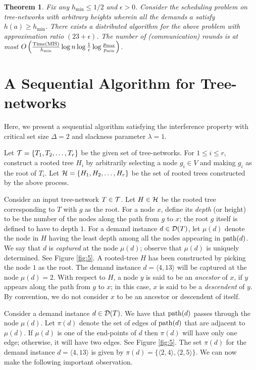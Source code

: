 \documentclass[11pt]{article}
\newtheorem{theorem}{\bf Theorem}[section]
\newcommand{\calT} {{\cal T}}
\newcommand{\calH} {{\cal H}}
\newcommand{\calD} {{\cal D}}
\newcommand{\mypath} {{\rm path}}
\newcommand{\TMIS} {{\rm Time(MIS)}}
\newcommand{\pair}[2] {\langle #1,#2 \rangle}
\begin{document}
\begin{theorem}
Fix any $h_{\min}\leq 1/2$ and $\epsilon>0$. Consider the scheduling problem on tree-networks
with arbitrary heights wherein all the demands $a$ satisfy $h(a) \geq h_{\min}$.
There exists a distributed algorithm for the above problem with approximation ratio $(23+\epsilon)$.
The number of (communication) rounds is at most 
$O\left( \frac{\TMIS}{h_{\min}} \log n \log{ \frac{1}{\epsilon} } \log{ \frac{p_{\max}}{p_{\min}} }\right)$.
\end{theorem}




\appendix
\section{A Sequential Algorithm for Tree-networks}
\label{sec:Lewin}
Here, we present a sequential algorithm satisfying the interference property with 
critical set size $\Delta=2$ and slackness parameter $\lambda = 1$.

Let $\calT=\{T_1, T_2, \ldots, T_r\}$ be the given set of tree-networks.
For $1\leq i\leq r$, construct a rooted tree $H_i$ by arbitrarily selecting a node $g_i\in V$ 
and making $g_i$ as the root of $T_i$. Let $\calH = \{H_1, H_2, \ldots, H_r\}$
be the set of rooted trees constructed by the above process.

Consider an input tree-network $T\in \calT$. 
Let $H\in \calH$ be the rooted tree corresponding to $T$ with $g$ as the root.
For a node $x$, define its {\em depth} (or height) to be the number
of the nodes along the path from $g$ to $x$; the root $g$ itself is defined to have to depth $1$.
For a demand instance $d\in \calD(T)$, let $\mu(d)$ denote the node in $H$
having the least depth among all the nodes appearing in $\mypath(d)$.
We say that $d$ is {\em captured} at the node $\mu(d)$; observe that $\mu(d)$ is uniquely determined.
See Figure \ref{fig:5}. A rooted-tree $H$ has been constructed by picking the node $1$ as the root.
The demand instance $d=\pair{4}{13}$ will be captured at the node $\mu(d)=2$.
With respect to $H$, a node $y$ is said to be an {\em ancestor} of $x$,
if $y$ appears along the path from $g$ to $x$; in this case, $x$ is said to be a {\em descendent} of $y$.
By convention, we do not consider $x$ to be an ancestor or descendent of itself.

Consider a demand instance $d\in \calD(T)$. 
We have that $\mypath(d)$ passes through the node $\mu(d)$. 
Let $\pi(d)$ denote the set of edges of $\mypath(d)$ that are adjacent to $\mu(d)$.
If $\mu(d)$ is one of the end-points of $d$ then $\pi(d)$ will have only one edge;
otherwise, it will have two edges. 
See Figure \ref{fig:5}. The set $\pi(d)$ for the demand instance $d=\pair{4}{13}$
is given by $\pi(d)=\{\pair{2}{4},\pair{2}{5}\}$.
We can now make the following important observation.
\end{document}

